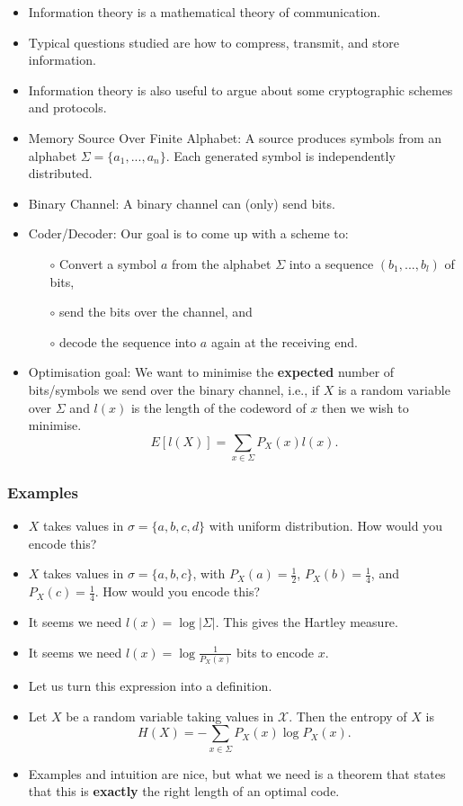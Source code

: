 \documentclass[a4paper]{scrartcl}
\begin{document}
\begin{itemize}
\item Information theory is a mathematical theory of communication.
\item Typical questions studied are how to compress, transmit, and store information.
\item Information theory is also useful to argue about some cryptographic schemes and protocols.
\item Memory Source Over Finite Alphabet: A source produces symbols from an alphabet $\Sigma = \{a_1,...,a_n\}$. Each generated symbol is independently distributed.
\item Binary Channel: A binary channel can (only) send bits. \item Coder/Decoder: Our goal is to come up with a scheme to:
\begin{itemize}
\item [$\circ$] Convert a symbol $a$ from the alphabet $\Sigma$ into a sequence $(b_1,...,b_l)$ of bits, 
\item [$\circ$] send the bits over the channel, and
\item [$\circ$] decode the sequence into $a$ again at the receiving end.
\end{itemize}
\item Optimisation goal: We want to minimise the \textbf{expected} number of bits/symbols we send over the binary channel, i.e., if $X$ is a random variable over $\Sigma$ and $l(x)$ is the length of the codeword of $x$ then we wish to minimise.
$$E[l(X)] = \sum_{x\in \Sigma}P_X(x)l(x).$$
\end{itemize}

\subsubsection*{Examples}
\begin{itemize}
\item $X$ takes values in $\sigma = \{a, b, c, d\}$ with uniform distribution. How would you encode this?
\item $X$ takes values in $\sigma = \{a,b,c\}$, with $P_X(a) = \frac{1}{2}$, $P_X(b) = \frac{1}{4}$, and $P_X(c) = \frac{1}{4}$. How would you encode this?
\item It seems we need $l(x) = \log |\Sigma|$. This gives the Hartley measure.
\item It seems we need $l(x) = \log\frac{1}{P_X(x)}$ bits to encode $x$.
\item Let us turn this expression into a definition.
\item Let $X$ be a random variable taking values in $\mathcal{X}$. Then the entropy of $X$ is $$H(X) = - \sum_{x\in\Sigma}P_X(x)\log P_X(x).$$
\item Examples and intuition are nice, but what we need is a theorem that states that this is \textbf{exactly} the right length of an optimal code.
\end{itemize}
\end{document}
